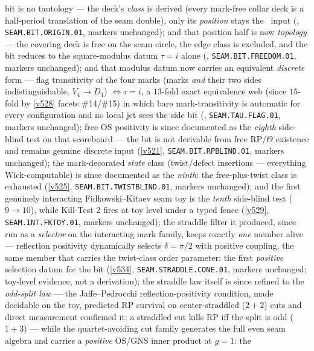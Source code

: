 \documentclass[11pt,a4paper]{article}
\begin{document}
bit is no tautology --- the deck's \emph{class} is derived (every mark-free collar deck is a
half-period translation of the seam double), only its \emph{position} stays the \mC\ input
(, \texttt{SEAM.BIT.ORIGIN.01}, markers unchanged); and that
position half is now \emph{topology} --- the covering deck is free on the seam circle, the
edge class is excluded, and the bit reduces to the square-modulus datum $\tau=i$ alone
(, \texttt{SEAM.BIT.FREEDOM.01}, markers unchanged); and that
modulus datum now carries an equivalent \emph{discrete} form --- flag transitivity of the four marks
(marks \emph{and} their two sides indistinguishable, $V_4\to D_4$) $\iff\tau=i$, a $13$-fold exact
equivalence web (since $15$-fold by \vref{v528} facets \#14/\#15) in which bare mark-transitivity is
automatic for every configuration and no local
jet sees the side bit (, \texttt{SEAM.TAU.FLAG.01}, markers
unchanged); free OS positivity is since documented as the \emph{eighth} side-blind test on that
scoreboard --- the bit is not derivable from free RP/$\Theta$ existence and remains genuine
discrete input (\vref{v521}, \texttt{SEAM.BIT.RPBLIND.01}, markers unchanged); the
mark-decorated \emph{state} class (twist/defect insertions --- everything Wick-computable)
is since documented as the \emph{ninth}: the free-plus-twist class is exhausted
(\vref{v525}, \texttt{SEAM.BIT.TWISTBLIND.01}, markers unchanged); and the first genuinely
interacting Fidkowski--Kitaev seam toy is the \emph{tenth} side-blind test ($9\to10$), while
Kill-Test 2 fires at toy level under a typed fence (\vref{v529}, \texttt{SEAM.INT.FKTOY.01},
markers unchanged); the straddle filter it produced, since run as a \emph{selector} on the
interacting mark family, keeps exactly \emph{one} member alive --- reflection positivity
dynamically selects $\delta=\pi/2$ with positive coupling, the same member that carries the
twist-class order parameter: the first \emph{positive} selection datum for the bit
(\vref{v534}, \texttt{SEAM.STRADDLE.CONE.01}, markers unchanged; toy-level evidence,
not a derivation); the straddle law itself is since refined to the \emph{odd-split law} ---
the Jaffe--Pedrocchi reflection-positivity condition, made decidable on the toy, predicted RP
survival on center-straddled ($2{+}2$) cuts and direct measurement confirmed it: a straddled
cut kills RP iff the split is odd ($1{+}3$) --- while the quartet-avoiding cut family generates
the full even seam algebra and carries a \emph{positive} OS/GNS inner product at $g=1$: the
\end{document}
